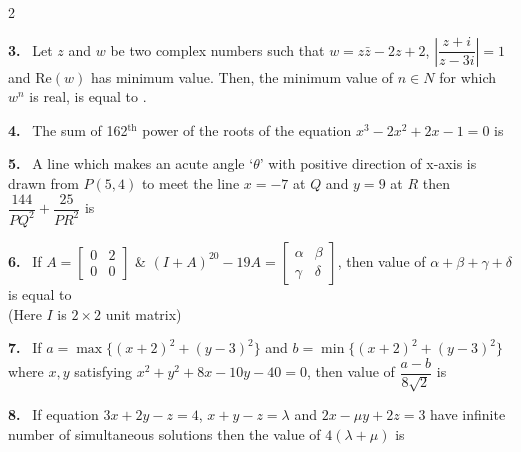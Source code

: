 \documentclass[10pt]{extarticle}
\newcommand{\qn}[1]{\par\smallskip\noindent\textbf{#1.}~}
\begin{document}
\begin{multicols}{2}
\qn{3} Let $z$ and $w$ be two complex numbers such that $w=z\bar z-2z+2$, $\left|\dfrac{z+i}{z-3i}\right|=1$ and $\mathrm{Re}(w)$ has minimum value. Then, the minimum value of $n\in N$ for which $w^n$ is real, is equal to \underline{\hspace{2.5em}}.

\qn{4} The sum of 162$^{\text{th}}$ power of the roots of the equation $x^3-2x^2+2x-1=0$ is

\qn{5} A line which makes an acute angle `$\theta$' with positive direction of x-axis is drawn from $P(5,4)$ to meet the line $x=-7$ at $Q$ and $y=9$ at $R$ then $\dfrac{144}{PQ^2}+\dfrac{25}{PR^2}$ is

\qn{6} If $A=\begin{bmatrix}0&2\\0&0\end{bmatrix}$ \& $(I+A)^{20}-19A=\begin{bmatrix}\alpha&\beta\\\gamma&\delta\end{bmatrix}$, then value of $\alpha+\beta+\gamma+\delta$ is equal to\\
(Here $I$ is $2\times2$ unit matrix)

\qn{7} If $a=\max\{(x+2)^2+(y-3)^2\}$ and $b=\min\{(x+2)^2+(y-3)^2\}$ where $x,y$ satisfying $x^2+y^2+8x-10y-40=0$, then value of $\dfrac{a-b}{8\sqrt2}$ is

\qn{8} If equation $3x+2y-z=4$, $x+y-z=\lambda$ and $2x-\mu y+2z=3$ have infinite number of simultaneous solutions then the value of $4(\lambda+\mu)$ is
\end{multicols}
\end{document}
